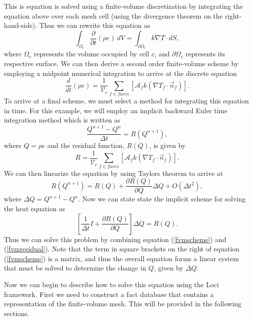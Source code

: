 \documentclass[10pt,epsf]{book}
\begin{document}
This is equation is solved using a finite-volume discretization by
integrating the equation above over each mesh cell (using the
divergence theorem on the right-hand-side).  Thus we can
rewrite this equation as
\begin{equation}
\int_{\Omega_c} \frac{\partial}{\partial t} (\rho e) ~dV =
\int_{\partial\Omega_c} k \nabla T \cdot dS,
\end{equation}
where $\Omega_c$ represents the volume occupied by cell $c$, and
$\partial\Omega_c$ represents its respective surface.  We can then
derive a second order finite-volume scheme by employing a midpoint
numerical integration to arrive at the discrete equation
\begin{equation}
\frac{d}{dt} (\rho e) = \frac{1}{\mathcal{V}_c}\sum_{f\in{faces}}
\left[ \mathcal{A}_f k \left(\nabla T_f \cdot \vec{n}_f\right) \right].
\end{equation}
To arrive at a final scheme, we must select a method for integrating
this equation in time.  For this example, we will employ an implicit
backward Euler time integration method which is written as
\begin{equation}
\frac{Q^{n+1}-Q^n}{\Delta t} = R(Q^{n+1}),
\end{equation}
where $Q=\rho e$ and the residual function, $R(Q)$, is given by 
\begin{equation}
R = \frac{1}{\mathcal{V}_c}\sum_{f\in{faces}}
\left[ \mathcal{A}_f k \left(\nabla T_f \cdot \vec{n}_f\right)
\right].
\label{fvmresidual}
\end{equation}
We can then linearize the equation by using Taylors theorem to arrive
at
\begin{equation}
R(Q^{n+1}) = R(Q) + \frac{\partial R(Q)}{\partial Q} \Delta Q +
O(\Delta t^2),
\end{equation}
where $\Delta Q = Q^{n+1}-Q^n$.  Now we can state state the implicit
scheme for solving the heat equation as
\begin{equation}
\left[ \frac{1}{\Delta t} I + \frac{\partial R(Q)}{\partial Q}\right]\Delta Q =
R(Q).
\label{fvmscheme}
\end{equation}
Thus we can solve this problem by combining equation (\ref{fvmscheme})
and (\ref{fvmresidual}).  Note that the term in square brackets on the
right of equation (\ref{fvmscheme}) is a matrix, and thus the overall
equation forms a linear system that must be solved to determine the
change in $Q$, given by $\Delta Q$.

Now we can begin to describe how to solve this equation using the Loci
framework.  First we need to construct a fact database that contains a
representation of the finite-volume mesh.  This will be provided in
the following sections.
\end{document}
